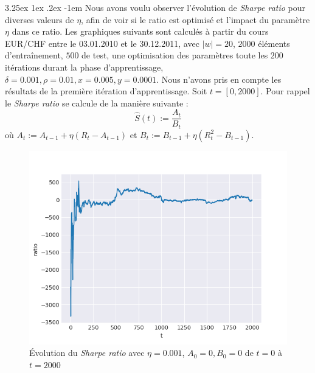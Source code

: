 \documentclass[a4paper, 11pt]{article}
\makeatletter
\renewcommand\paragraph{\@startsection{paragraph}{5}{\z@}%
  {3.25ex \@plus1ex \@minus.2ex}%
  {-1em}%
  {\normalfont\normalsize\bfseries}}
\makeatother
\begin{document}
  \paragraph{}
 Nous avons voulu observer l'évolution de \textit{Sharpe ratio} pour diverses valeurs de $\eta$, afin de voir si le ratio est optimisé et l'impact
 du paramètre $\eta$ dans ce ratio. Les graphiques suivants sont calculés à partir du cours EUR/CHF entre le 03.01.2010 et le 30.12.2011, avec 
 $|w| = 20$, $2000$ éléments d'entraînement, $500$ de test, une optimisation des
 paramètres toute les $200$ itérations durant la phase d'apprentissage, $\delta = 0.001, \rho=0.01, x = 0.005, y=0.0001$. Nous n'avons pris en compte 
 les résultats de la première itération d'apprentissage. Soit $t= [0,2000]$.
 Pour rappel le \textit{Sharpe ratio} se calcule de la manière suivante :
 $$\widehat{S}(t) := \frac{A_t}{B_t}$$
 où $A_t := A_{t-1} + \eta (R_t - A_{t-1})$ et $B_t := B_{t-1} + \eta (R_t^2 - B_{t-1})$.
 
 
 \begin{figure}[H]
 	\centering
 	\includegraphics[]{res/exemple_eta_0001}
 	\caption[Blup]{Évolution du \textit{Sharpe ratio} avec $\eta = 0.001$, $A_0 = 0, B_0 = 0$ de $t=0$ à $t=2000$}
 	\label{sharpe ratio eta=0.0001}
 \end{figure}
 
\end{document}
